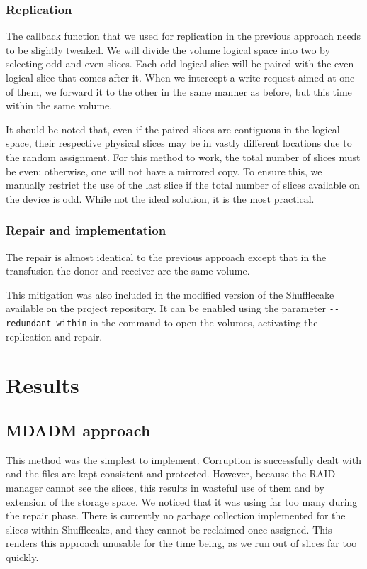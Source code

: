\documentclass[a4paper,11pt,oneside]{report}
\begin{document}
\subsection{Replication}

The callback function that we used for replication in the previous approach needs to be slightly tweaked. We will divide the volume logical space into two by selecting odd and even slices. Each odd logical slice will be paired with the even logical slice that comes after it. When we intercept a write request aimed at one of them, we forward it to the other in the same manner as before, but this time within the same volume.

It should be noted that, even if the paired slices are contiguous in the logical space, their respective physical slices may be in vastly different locations due to the random assignment. For this method to work, the total number of slices must be even; otherwise, one will not have a mirrored copy. To ensure this, we manually restrict the use of the last slice if the total number of slices available on the device is odd. While not the ideal solution, it is the most practical.

\subsection{Repair and implementation}

The repair is almost identical to the previous approach except that in the transfusion the donor and receiver are the same volume.

This mitigation was also included in the modified version of the Shufflecake available on the project repository\cite{github}. It can be enabled using the parameter \verb|--redundant-within| in the command to open the volumes, activating the replication and repair.

\newpage
\let\clearpage\relax

\chapter{Results}

\section{MDADM approach}

This method was the simplest to implement. Corruption is successfully dealt with and the files are kept consistent and protected. However, because the RAID manager cannot see the slices, this results in wasteful use of them and by extension of the storage space. We noticed that it was using far too many during the repair phase. There is currently no garbage collection implemented for the slices within Shufflecake, and they cannot be reclaimed once assigned. This renders this approach unusable for the time being, as we run out of slices far too quickly.
\end{document}
